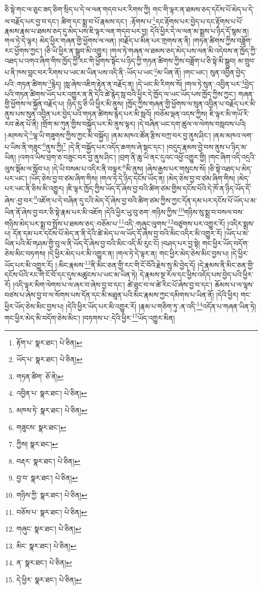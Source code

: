 ཅི་སྟེ་གང་ལ་ཅུང་ཟད་ཅིག་སྲིད་པ་དེ་ལ་ལན་གདབ་པར་རིགས་ཀྱི། གང་གི་ལྟར་ན་ཐམས་ཅད་དངོས་པོ་མེད་པ་དེ་ལ་བརྗོད་པར་བྱ་བ་དང་། ཚིག་དང་སྨྲ་བ་པོ་རྣམས་དང་། :རྟོགས་པ་\footnote{རྟོག་པ་  སྣར་ཐང་།  པེ་ཅིན། }དང་རྟོགས་པར་བྱེད་པ་དང་རྟོགས་པ་པོ་རྣམས་རྣམ་པ་ཐམས་ཅད་དུ་མེད་པས་ཇི་ལྟར་ལན་གདབ་པར་བྱ། དེའི་ཕྱིར་དེ་ལ་ལན་མ་སྨྲས་པ་ཉིད་དོ་སྙམ་ན། གལ་ཏེ་དེ་ལྟར། མེད་ཕྱིར་གཞན་གྱི་ཕྱོགས་ལ་ལན། །བརྗོད་པ་མིན་པར་གྲགས་ན་ནི། །གཏན་ཚིགས་ཀྱིས་བཟློག་རང་ཕྱོགས་ཀྱང་། །ཅི་ཡི་ཕྱིར་ན་སྒྲུབ་མི་འགྱུར། །གལ་ཏེ་གཞན་ལ་ཐམས་ཅད་མེད་པས་ལན་མི་འདེབས་ན་ཁྱོད་ཀྱི་འཐད་པ་འགའ་ཞིག་གིས་ཁྱོད་ཀྱི་རང་གི་ཕྱོགས་སྟོང་པ་ཉིད་ཀྱི་གཏན་ཚིགས་ཀྱིས་བཟློག་པ་ཅི་སྟེ་མི་སྒྲུབ། མ་གྲུབ་པ་ནི་ཁས་བླང་བར་རིགས་པ་ཡང་མ་ཡིན་པས་འདི་ནི་:ཡོད་པ་ཡང་\footnote{ཡོད་པ་  སྣར་ཐང་།  པེ་ཅིན། }མ་ཡིན་ནོ། །གང་ཡང་། སུན་འབྱིན་བྱེད་པའི་:གཏན་ཚིགས་\footnote{གཏན་ཚིག་  ཅོ་ནེ། }རྙེད། །སླ་ཞེས་འཇིག་རྟེན་ན་བརྗོད་ན། །དེ་ཡང་མི་རིགས་སོ། །གལ་ཏེ་སུན་:འབྱིན་པར་\footnote{འབྱིན་པ་  སྣར་ཐང་།  པེ་ཅིན། }བྱེད་པའི་གཏན་ཚིགས་ཡོད་པར་འགྱུར་ན་ནི་དེའི་ཚེ་རྙེད་སླ་བའི་ཕྱིར་དེ་ཁྱོད་ལ་ཡང་ཡོད་པས་ཁྱོད་ཀྱིས་ཀྱང་། གཞན་གྱི་ཕྱོགས་ལ་སྐྱོན་བརྗོད་པ། །ཉིད་དུ་ཅི་ཡི་ཕྱིར་མི་ནུས། །ཁྱོད་ཀྱིས་གཞན་གྱི་ཕྱོགས་ལ་སུན་འབྱིན་པ་བརྗོད་པར་མི་ནུས་པས་སུན་འབྱིན་པར་བྱེད་པའི་གཏན་ཚིགས་རྙེད་པར་མི་སླའོ། །བཅོམ་ལྡན་འདས་ཀྱིས། ཇི་ལྟར་མི་གཡོ་རི་རབ་ཆེན་པོ་ནི། །གྲོག་མ་ཀུན་གྱིས་བསྐྱོད་པར་མི་ནུས་ལྟར། །དེ་བཞིན་ཡང་དག་ཚུལ་ལ་ལེགས་བསླབས་པའི། །:མཁས་དེ་\footnote{མཁས་ཏེ་  སྣར་ཐང་།  པེ་ཅིན། }ལྷ་ཡི་གཟུགས་ཀྱིས་ཀྱང་མི་བསྐྱོད། །ནམ་མཁའ་ཚོན་རྩིས་བཀྲ་བར་བྱ་ནུས་ཤིང་། །ནམ་མཁའ་ལག་པ་ཡིས་ནི་གཟུང་\footnote{གཟུངས་  སྣར་ཐང་། }ནུས་ཀྱི།\footnote{ཀྱིས།  སྣར་ཐང་། } །དེ་ནི་བསྐྱོད་པར་འདོད་ཆགས་ཞེ་སྡང་དང་། །བདུད་རྣམས་བྱེ་བས་ནུས་པ་ཉིད་མ་ཡིན། །འགའ་ཡིས་བྲག་ཅ་བཟུང་བར་བྱ་ནུས་ཤིང་། །བྲག་ནི་ཆུ་ཡི་ནང་དུའང་འཕྱོ་འགྱུར་གྱི། །གང་ཞིག་འདི་འདྲའི་ལུས་སྡོམ་ལ་སློབ་པ། །དེ་ཡི་བསམ་པ་འདིར་ནི་བལྟར་\footnote{བརྡར་  སྣར་ཐང་།  པེ་ཅིན། }མི་ནུས། །ཞེས་རྒྱས་པར་གསུངས་སོ། །ཅི་སྟེ་འཐད་པ་མེད་པར་ཡང་། །ཡོད་ཅེས་བྱ་བ་ཙམ་ཞིག་གིས། །གལ་ཏེ་དེ་ཉིད་དངོས་ཡོད་ན། །མེད་ཅེས་བྱ་བ་ཙམ་ཞིག་གིས། །མེད་པར་ཡང་ནི་ཅིས་མི་འགྱུར། །ཇི་ལྟར་ཁྱོད་ཀྱིས་ཡོད་དོ་ཞེས་བྱ་བའི་ཚིག་ཙམ་གྱིས་དངོས་པོའི་དེ་ཁོ་ན་ཉིད་ཡོད་དོ་ཞེས་:བྱ་བར་\footnote{བྱ་བ་  སྣར་ཐང་།  པེ་ཅིན། }འཇོག་པ་དེ་བཞིན་དུ་ངའི་མེད་དོ་ཞེས་བྱ་བའི་ཚིག་ཙམ་ཀྱིས་ཀྱང་དོན་དམ་པར་དངོས་པོ་ཡོད་པ་མ་ཡིན་ནོ་ཞེས་བྱ་བར་ཅི་སྟེ་རྣམ་པར་མི་འཇོག །དེའི་ཕྱིར་ཡུ་བུ་ཅག་:གཉིས་ཀྱིས་\footnote{གཉིས་ཀྱི་  སྣར་ཐང་།  པེ་ཅིན། }གཉིས་སུ་སྨྲ་བ་བསལ་བས་གཉིས་མེད་པར་སྨྲ་བ་སྤྲོས་པ་ཐམས་ཅད་:བཅོམ་པ་\footnote{བཅོས་པ་  སྣར་ཐང་།  པེ་ཅིན། }འདི་:གཞུང་ལུགས་\footnote{གཞུང་  སྣར་ཐང་།  པེ་ཅིན། }བཙུགས་པར་འགྱུར་རོ། །འདིར་སྨྲས་པ། དོན་དམ་པར་དངོས་པོ་མེད་ན་ནི་དེའི་ཚེ་མེད་པ་ལ་ཡོད་དོ་ཞེས་བྱ་བའི་མིང་འདིར་མི་འགྱུར་རོ། །ཡོད་པ་མ་ཡིན་པའི་མོ་གཤམ་གྱི་བུ་ལ་ནི་ཡོད་དོ་ཞེས་བྱ་བའི་མིང་འདི་མི་རུང་ངོ། །བཤད་པར་བྱ་སྟེ། གང་ཕྱིར་ཡོད་བདོག་ཅེས་མིང་བཏགས། །དེ་ཕྱིར་མེད་པར་མི་འགྱུར་ན། །གལ་ཏེ་དེ་ལྟར་ན། གང་ཕྱིར་མེད་ཅེས་མིང་བྱས་པ། །དེ་ཕྱིར་ཡོད་པར་མི་འགྱུར་རོ། །:མིང་རྣམས་\footnote{མིང་  སྣར་ཐང་།  པེ་ཅིན། }ནི་མིང་ཅན་གྱི་རང་གི་ངོ་བོའི་རྗེས་སུ་མི་བྱེད་དོ། །དེ་རྣམས་ནི་མིང་ཅན་གྱི་དངོས་པོའི་རང་གི་ངོ་བོ་དང་དུས་མཚུངས་པ་ཡང་མ་ཡིན་ཏེ། དེ་རྣམས་སྔ་རོལ་དང་ཕྱིས་འདོད་པས་བྱེད་པའི་ཕྱིར་རོ། །འདི་ལྟར་མིག་ལེགས་པ་ལ་ཞར་བ་ཞེས་བྱ་བ་དང་། ཚེ་ཐུང་བ་ལ་ཚེ་རིང་པོ་ཞེས་བྱ་བ་དང་། ཆོམས་པ་ལ་ལྷས་བཙས་པ་ཞེས་བྱ་བ་ལ་སོགས་པས་དོན་དང་མི་མཐུན་པའི་མིང་རྣམས་ཀྱང་དམིགས་པ་ཡིན་ནོ། །དེའི་ཕྱིར། གང་ཕྱིར་ཡོད་ཅེས་མིང་བྱས་པ། །དེའི་ཕྱིར་ཡོད་པར་མི་འགྱུར་རོ། །རྣམ་པ་གཅིག་ཏུ་:ན་འདི་\footnote{ན་  སྣར་ཐང་།  པེ་ཅིན། }འདོན་པ་གཞན་ཡིན་ཏེ། གང་ཕྱིར་མེད་མི་བདོག་ཅེས་མིང་། །བཏགས་པ་:དེའི་ཕྱིར་\footnote{དེ་ཕྱིར་  སྣར་ཐང་།  པེ་ཅིན། }ཡོད་འགྱུར་མིན། 